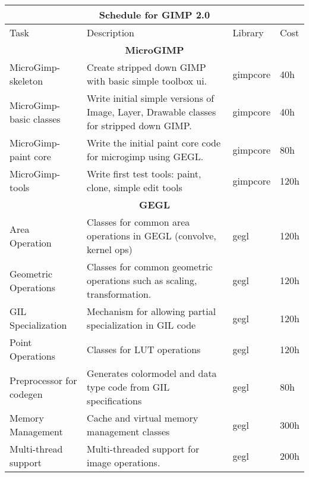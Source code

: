\begin{flushleft}		
\begin{tabular}{|p{2cm}|p{5cm}|p{2cm}|l|}\hline
\multicolumn{4}{|c|}{\rule[-3mm]{0mm}{8mm} \large \bf Schedule for GIMP 2.0}\\  
\hline
Task & Description & Library & Cost\\ 
\hline 

\multicolumn{4}{|c|}{\bf MicroGIMP}\\
\hline
MicroGimp-skeleton & Create stripped down GIMP with basic simple toolbox ui. & gimpcore & 40h\\
\hline
MicroGimp-basic classes & Write initial simple versions of Image, Layer, Drawable classes for stripped down GIMP. & gimpcore & 40h\\
\hline
MicroGimp-paint core & Write the initial paint core code for microgimp using GEGL. & gimpcore & 80h\\
\hline
MicroGimp-tools & Write first test tools: paint, clone, simple edit tools  & gimpcore & 120h\\
\hline

\multicolumn{4}{|c|}{\bf GEGL}\\
\hline
\raggedright{Area\\ Operation} & Classes for common area operations in GEGL (convolve, kernel ops) & gegl & 120h\\
\hline
\raggedright{Geometric\\ Operations} & Classes for common geometric operations such as scaling, transformation. & gegl & 120h\\
\hline
\raggedright{GIL\\ Specialization} & Mechanism for allowing partial specialization in GIL code & gegl & 120h\\
\hline
\raggedright{Point\\ Operations} & Classes for LUT operations & gegl & 120h\\
\hline
\raggedright{Preprocessor for\\ codegen} & Generates colormodel and data type code from GIL specifications & gegl & 80h\\
\hline
\raggedright{Memory \\Management} & \raggedright{Cache and virtual memory management classes} & gegl & 300h\\
\hline
\raggedright{Multi-thread \\support} & \raggedright{Multi-threaded support for image operations.} & gegl & 200h\\  
\hline


\end{tabular}
\end{flushleft}
